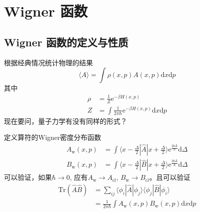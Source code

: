 \chapter{Wigner 函数}
    \section{Wigner 函数的定义与性质}

        根据经典情况统计物理的结果
        \begin{equation*}
            \langle A \rangle = \int \rho(x,p) A(x,p) \mathrm{d}x\mathrm{d}p
        \end{equation*}
        其中 
        \begin{align*}
            \rho &= \frac 1Z \mathrm{e}^{-\beta H(x,p)}\\
            Z &= \int \frac 1{2\pi \hbar} \mathrm{e}^{-\beta H(x,p)} \mathrm{d}x \mathrm{d}p
        \end{align*}
        现在要问，量子力学有没有同样的形式？

        定义算符的Wigner密度分布函数
        \begin{align*}
            A_\mathrm{w}(x,p) &= \int \langle x - \frac {\Delta}2 | \hat{A} | x + \frac {\Delta}2 \rangle \mathrm{e}^{\frac {\mathrm{i} p \Delta}{\hbar}} \mathrm{d} \Delta \\
            B_\mathrm{w}(x,p) &= \int \langle x - \frac {\Delta}2 | \hat{B} | x + \frac {\Delta}2 \rangle \mathrm{e}^{\frac {\mathrm{i} p \Delta}{\hbar}} \mathrm{d} \Delta 
        \end{align*}
        可以验证，如果$\hbar \to 0$, 应有$A_\mathrm{w} \to A_\mathrm{cl}$, $B_\mathrm{w} \to B_\mathrm{cl}$。且可以验证
        \begin{align*}
            \mathrm{Tr} (\hat{A}\hat{B}) &= \sum_{ij} \langle \phi_{i} | \hat{A} | \phi_{j} \rangle \langle \phi_{j} | \hat{B} | \phi_{i} \rangle \\
            &= \frac 1{2\pi\hbar} \int A_\mathrm{w}(x,p) B_\mathrm{w}(x,p) \mathrm{d}x \mathrm{d}p
        \end{align*}

